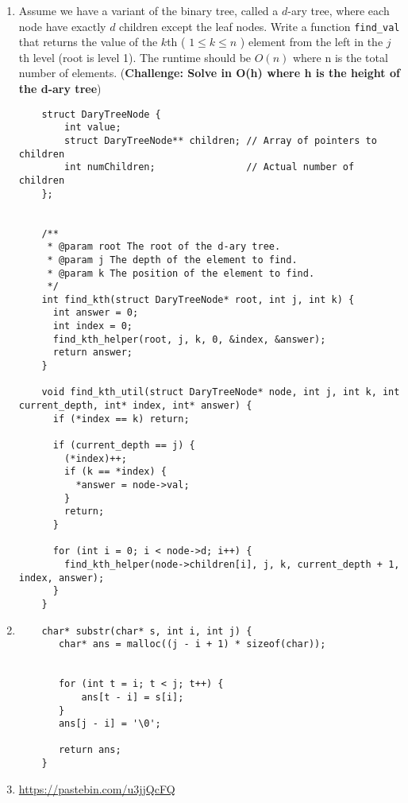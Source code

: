 \documentclass{article}
\begin{document}
\begin{enumerate}
\begin{lstlisting}
    \end{lstlisting}



    \newpage
    \item Assume we have a variant of the binary tree, called a \( d \)-ary tree, where each node have exactly \( d \) children except the leaf nodes. Write a function \texttt{find\_val} that returns the value of the \( k \)th ( \( 1 \leq k \leq n \) ) element from the left in the  \( j \)th level (root is level 1). The runtime should be $O(n)$ where n is the total number of elements. (\textbf{Challenge: Solve in O(h) where h is the height of the d-ary tree})

    
    \begin{lstlisting}
    struct DaryTreeNode {
        int value;
        struct DaryTreeNode** children; // Array of pointers to children
        int numChildren;                // Actual number of children
    };
    
    
    /**
     * @param root The root of the d-ary tree.
     * @param j The depth of the element to find.
     * @param k The position of the element to find.
     */
    int find_kth(struct DaryTreeNode* root, int j, int k) {
      int answer = 0;
      int index = 0;
      find_kth_helper(root, j, k, 0, &index, &answer);
      return answer; 
    }
    
    void find_kth_util(struct DaryTreeNode* node, int j, int k, int current_depth, int* index, int* answer) {
      if (*index == k) return;
      
      if (current_depth == j) {
        (*index)++;
        if (k == *index) {
          *answer = node->val;
        }
        return;
      }
    
      for (int i = 0; i < node->d; i++) {
        find_kth_helper(node->children[i], j, k, current_depth + 1, index, answer);
      }
    }
\end{lstlisting}


    
    \newpage
    \item 
    \begin{lstlisting}
    char* substr(char* s, int i, int j) {
       char* ans = malloc((j - i + 1) * sizeof(char));
    
    
       for (int t = i; t < j; t++) {
           ans[t - i] = s[i];
       }
       ans[j - i] = '\0';
      
       return ans;
    }
    \end{lstlisting}


    \newpage
    \item 
    \url{https://pastebin.com/u3jjQcFQ}

    
\end{enumerate}
\end{document}
